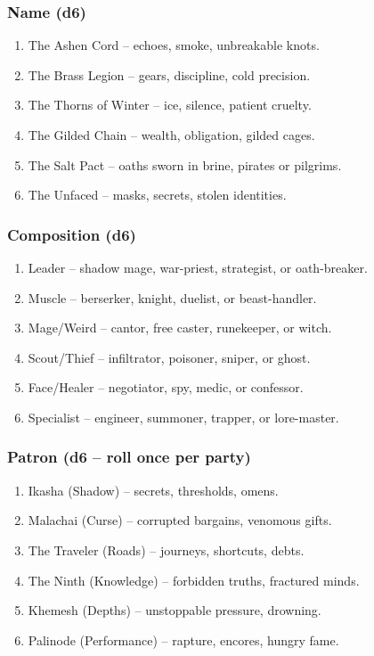 \subsubsection*{Name (d6)}
\begin{enumerate}[label=\arabic*.]
    \item The Ashen Cord -- echoes, smoke, unbreakable knots.
    \item The Brass Legion -- gears, discipline, cold precision.
    \item The Thorns of Winter -- ice, silence, patient cruelty.
    \item The Gilded Chain -- wealth, obligation, gilded cages.
    \item The Salt Pact -- oaths sworn in brine, pirates or pilgrims.
    \item The Unfaced -- masks, secrets, stolen identities.
\end{enumerate}

\subsubsection*{Composition (d6)}
\begin{enumerate}[label=\arabic*.]
    \item Leader -- shadow mage, war-priest, strategist, or oath-breaker.
    \item Muscle -- berserker, knight, duelist, or beast-handler.
    \item Mage/Weird -- cantor, free caster, runekeeper, or witch.
    \item Scout/Thief -- infiltrator, poisoner, sniper, or ghost.
    \item Face/Healer -- negotiator, spy, medic, or confessor.
    \item Specialist -- engineer, summoner, trapper, or lore-master.
\end{enumerate}

\subsubsection*{Patron (d6 -- roll once per party)}
\begin{enumerate}[label=\arabic*.]
    \item Ikasha (Shadow) -- secrets, thresholds, omens.
    \item Malachai (Curse) -- corrupted bargains, venomous gifts.
    \item The Traveler (Roads) -- journeys, shortcuts, debts.
    \item The Ninth (Knowledge) -- forbidden truths, fractured minds.
    \item Khemesh (Depths) -- unstoppable pressure, drowning.
    \item Palinode (Performance) -- rapture, encores, hungry fame.
\end{enumerate}

